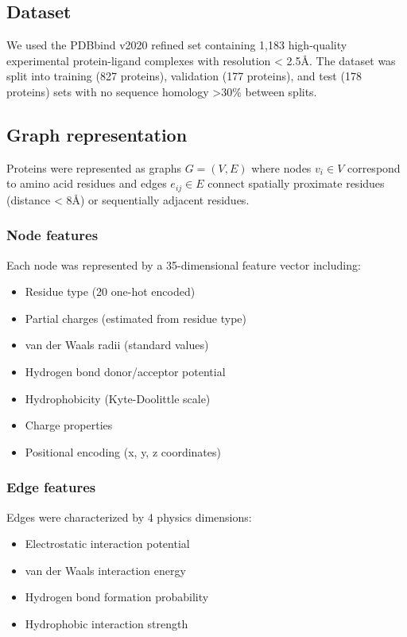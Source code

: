 \subsection*{Dataset}
We used the PDBbind v2020 refined set containing 1,183 high-quality experimental protein-ligand complexes with resolution < 2.5Å. The dataset was split into training (827 proteins), validation (177 proteins), and test (178 proteins) sets with no sequence homology >30\% between splits.

\subsection*{Graph representation}
Proteins were represented as graphs $G = (V, E)$ where nodes $v_i \in V$ correspond to amino acid residues and edges $e_{ij} \in E$ connect spatially proximate residues (distance < 8Å) or sequentially adjacent residues.

\subsubsection*{Node features}
Each node was represented by a 35-dimensional feature vector including:
\begin{itemize}
    \item Residue type (20 one-hot encoded)
    \item Partial charges (estimated from residue type)
    \item van der Waals radii (standard values)
    \item Hydrogen bond donor/acceptor potential
    \item Hydrophobicity (Kyte-Doolittle scale)
    \item Charge properties
    \item Positional encoding (x, y, z coordinates)
\end{itemize}

\subsubsection*{Edge features}
Edges were characterized by 4 physics dimensions:
\begin{itemize}
    \item Electrostatic interaction potential
    \item van der Waals interaction energy
    \item Hydrogen bond formation probability
    \item Hydrophobic interaction strength
\end{itemize}

